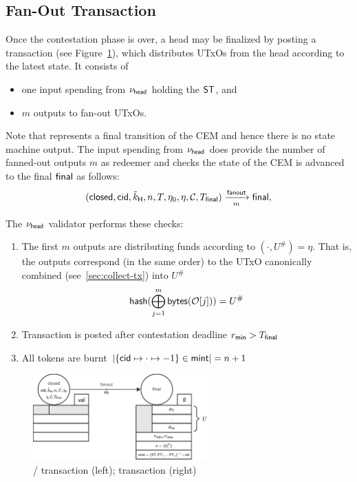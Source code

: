 \subsection{Fan-Out Transaction}

\begin{samepage}
Once the contestation phase is over, a head may be finalized by posting a
\mtxFanout{} transaction (see Figure~\ref{fig:SM-fanout}), which
distributes UTxOs from the head according to the latest state. It consists of
\begin{itemize}
  \item one input spending from $\nu_\mathsf{head}$ holding the $\mathsf{ST}$, and
  \item $m$ outputs to fan-out UTxOs.
\end{itemize}
Note that \mtxFanout{} represents a final transition of the CEM and hence there
is no state machine output. The input spending from $\nu_\mathsf{head}$ does provide the
number of fanned-out outputs $m$ as redeemer and checks the state of the CEM is
advanced to the final $\mathsf{final}$ as follows:
\[
  (\mathsf{closed},\mathsf{cid},\tilde{k}_{\mathsf{H}},n,T,\eta_0,\eta,\mathcal{C},T_{\mathsf{final}}) \xrightarrow[m]{\mathsf{fanout}} \mathsf{final},
\]
\end{samepage}

\noindent The $\nu_\mathsf{head}$ validator performs these checks:
\begin{enumerate}
  \item The first $m$ outputs are distributing funds according to
        $(\cdot, U^{\#}) = \eta$. That is, the outputs correspond (in the same
        order) to the UTxO canonically combined (see~\ref{sec:collect-tx}) into
        $U^{\#}$
        \[
        \mathsf{hash}(\bigoplus_{j=1}^{m} \mathsf{bytes}(\mathcal{O}[j])) = U^{\#}
        \]
  \item Transaction is posted after contestation deadline $r_{\mathsf{min}} > T_{\mathsf{final}}$
  \item All tokens are burnt
        $|\{\mathsf{cid} \mapsto \cdot \mapsto -1\} \in \mathsf{mint}| = n + 1$
\end{enumerate}

\begin{figure}[h]
  \centering
  \includegraphics[width=0.6\textwidth]{figures/SM-fanout.pdf}
  \caption{\mtxClose{}/\mtxContest{} transaction (left);
    \mtxFanout{} transaction (right)}\label{fig:SM-fanout}
\end{figure}

\FloatBarrier{}

